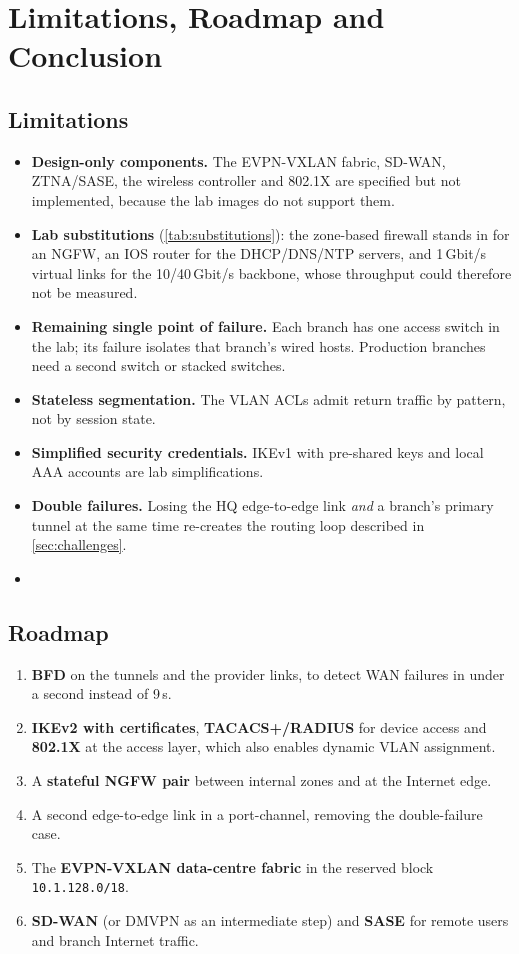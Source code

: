 \section{Limitations, Roadmap and Conclusion}\label{sec:conclusion}

\subsection{Limitations}
\begin{itemize}
  \item \textbf{Design-only components.} The EVPN-VXLAN fabric, SD-WAN, ZTNA/SASE, the wireless controller
        and 802.1X are specified but not implemented, because the lab images do not support them.
  \item \textbf{Lab substitutions} (\cref{tab:substitutions}): the zone-based firewall stands in for an NGFW,
        an IOS router for the DHCP/DNS/NTP servers, and 1\,Gbit/s virtual links for the 10/40\,Gbit/s
        backbone, whose throughput could therefore not be measured.
  \item \textbf{Remaining single point of failure.} Each branch has one access switch in the lab; its failure
        isolates that branch's wired hosts. Production branches need a second switch or stacked switches.
  \item \textbf{Stateless segmentation.} The VLAN ACLs admit return traffic by pattern, not by session state.
  \item \textbf{Simplified security credentials.} IKEv1 with pre-shared keys and local AAA accounts are lab
        simplifications.
  \item \textbf{Double failures.} Losing the HQ edge-to-edge link \emph{and} a branch's primary tunnel at the
        same time re-creates the routing loop described in \cref{sec:challenges}.
  \item {}
\end{itemize}

\subsection{Roadmap}
\begin{enumerate}
  \item \textbf{BFD} on the tunnels and the provider links, to detect WAN failures in under a second instead of 9\,s.
  \item \textbf{IKEv2 with certificates}, \textbf{TACACS+/RADIUS} for device access and \textbf{802.1X} at the
        access layer, which also enables dynamic VLAN assignment.
  \item A \textbf{stateful NGFW pair} between internal zones and at the Internet edge.
  \item A second edge-to-edge link in a port-channel, removing the double-failure case.
  \item The \textbf{EVPN-VXLAN data-centre fabric} in the reserved block \texttt{10.1.128.0/18}.
  \item \textbf{SD-WAN} (or DMVPN as an intermediate step) and \textbf{SASE} for remote users and branch
        Internet traffic.
\end{enumerate}

